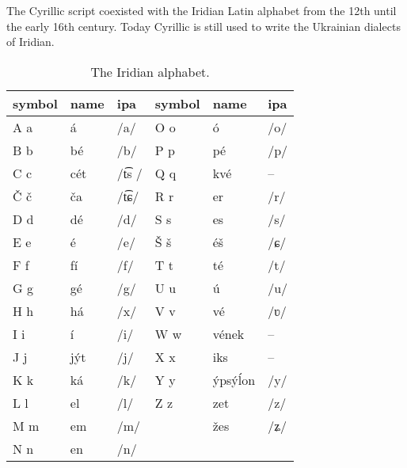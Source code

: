 The Cyrillic script coexisted with the Iridian Latin alphabet from the 12th until the early 16th century. Today Cyrillic is still used to write the Ukrainian dialects of Iridian.

\begin{table}
	\small
 	\caption{The Iridian alphabet.}
	\medskip
	\begin{tabu}to 0.9 \textwidth {YY[1.3]YYY[1.3]Y}
		\toprule
		{{\sc  symbol}} & {\sc name} & {\sc ipa} & {{\sc  symbol}} & {\sc name} & {\sc ipa}\\
		\midrule
		A a	  	& á 		& /a/				& O o 	& \'o 				& /o/\\
		B b			& bé	& /b/				& P p		& pé				& /p/\\
		C c			& cét & /t͡s /		& Q q		& kvé				& --\\
		Č č			& ča		& /t͡ɕ/			& R r		& er					& /r/\\
		D d			& dé	& /d/				& S s		& es					& /s/\\
		E e			& é		& /e/				& Š š		& éš 				& /ɕ/\\
		F f			& fí	& /f/				& T t		& té				& /t/\\
		G g			& gé 	& /g/				& U u 	& ú					& /u/\\
		H h			& há 		& /x/				& V v 	& vé 				& /ʋ/\\
		I i			& í 		& /i/				& W w		& vének				& --\\
		J j			& j\'yt	& /j/				& X x		& iks 				& --\\
		K k 		& ká 		& /k/				& Y y		& ýpsý\'lon		& /y/\\
		L l 		& el 		& /l/				& Z z		& zet 				& /z/\\
		M m			& em 		& /m/				& 		& žes 				& /ʑ/ \\
		N n			& en		& /n/				&				&							&	\\
		\bottomrule
	\end{tabu}
\end{table}

